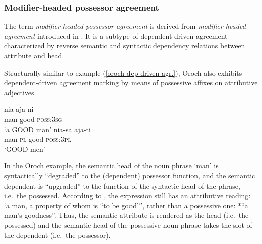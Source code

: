 \subsubsection{Modifier\hyp{}headed possessor agreement} \label{ModheadAgr}
The term \emph{modifier\hyp{}headed possessor agreement} is derived from \emph{modifier\hyp{}headed agreement} introduced in \citet{AUTOTYP-NP}. It is a subtype of dependent-driven agreement characterized by reverse semantic and syntactic dependency relations between attribute and head. 

Structurally similar to example (\ref{oroch dep-driven agr.}), Oroch also exhibits dependent-driven agreement marking by means of possessive affixes on attributive adjectives.
\begin{exe}
\ex
\label{oroch mod-headed agr}
\begin{xlist}
\ex
\gll 	nia	aja-ni\\
	man	good-\textsc{poss:3sg}\\
\glt	‘a GOOD man’
\ex 
\gll nia-sa aja-ti\\	
	man-\textsc{pl} good-\textsc{poss:3pl}\\
\glt	‘GOOD men’
\end{xlist}
\end{exe}
In the Oroch example, the semantic head of the noun phrase ‘man’ is syntactically “degraded” to the (dependent) possessor function, and the semantic dependent is “upgraded” to the function of the syntactic head of the phrase, i.e.~the possessed. According to \citet[3]{malchukov2000}, the expression still has an attributive reading: ‘a man, a property of whom is “to be good”’, rather than a possessive one: *“a man's goodness”. Thus, the semantic attribute is rendered as the head (i.e.~the possessed) and the semantic head of the possessive noun phrase takes the slot of the dependent (i.e.~the possessor).

